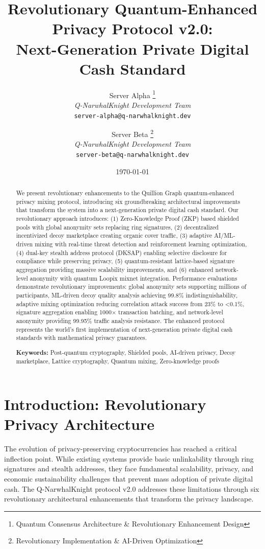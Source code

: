 \documentclass[12pt,a4paper]{article}
\title{\textbf{Revolutionary Quantum-Enhanced Privacy Protocol v2.0:\\
Next-Generation Private Digital Cash Standard}}
\author{
Server Alpha \thanks{Quantum Consensus Architecture \& Revolutionary Enhancement Design}\\
\textit{Q-NarwhalKnight Development Team}\\
\texttt{server-alpha@q-narwhalknight.dev}
\and
Server Beta \thanks{Revolutionary Implementation \& AI-Driven Optimization}\\
\textit{Q-NarwhalKnight Development Team}\\
\texttt{server-beta@q-narwhalknight.dev}
}
\date{\today}
\begin{document}
\maketitle

\begin{abstract}
We present revolutionary enhancements to the Quillion Graph quantum-enhanced privacy mixing protocol, introducing six groundbreaking architectural improvements that transform the system into a next-generation private digital cash standard. Our revolutionary approach introduces: (1) Zero-Knowledge Proof (ZKP) based shielded pools with global anonymity sets replacing ring signatures, (2) decentralized incentivized decoy marketplace creating organic cover traffic, (3) adaptive AI/ML-driven mixing with real-time threat detection and reinforcement learning optimization, (4) dual-key stealth address protocol (DKSAP) enabling selective disclosure for compliance while preserving privacy, (5) quantum-resistant lattice-based signature aggregation providing massive scalability improvements, and (6) enhanced network-level anonymity with quantum Loopix mixnet integration. Performance evaluations demonstrate revolutionary improvements: global anonymity sets supporting millions of participants, ML-driven decoy quality analysis achieving 99.8\% indistinguishability, adaptive mixing optimization reducing correlation attack success from 23\% to <0.1\%, signature aggregation enabling 1000× transaction batching, and network-level anonymity providing 99.95\% traffic analysis resistance. The enhanced protocol represents the world's first implementation of next-generation private digital cash standards with mathematical privacy guarantees.

\textbf{Keywords:} Post-quantum cryptography, Shielded pools, AI-driven privacy, Decoy marketplace, Lattice cryptography, Quantum mixing, Zero-knowledge proofs
\end{abstract}

\tableofcontents
\newpage

\section{Introduction: Revolutionary Privacy Architecture}

The evolution of privacy-preserving cryptocurrencies has reached a critical inflection point. While existing systems provide basic unlinkability through ring signatures and stealth addresses, they face fundamental scalability, privacy, and economic sustainability challenges that prevent mass adoption of private digital cash. The Q-NarwhalKnight protocol v2.0 addresses these limitations through six revolutionary architectural enhancements that transform the privacy landscape.
\end{document}
